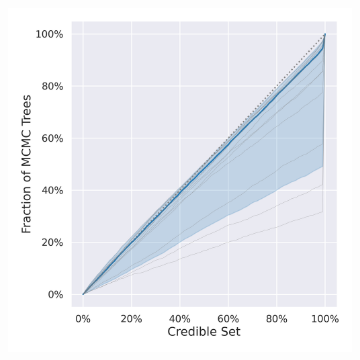 \documentclass[10pt,letterpaper]{article}
\begin{document}
\begin{figure}
\begin{subfigure}[b]{0.4\textwidth}
		\includegraphics[width=\textwidth]{figures/yule-200-ccd1-credible-sets-Shortest Branch (Gamma).png}
	\end{subfigure}
	

\end{figure}
\end{document}

